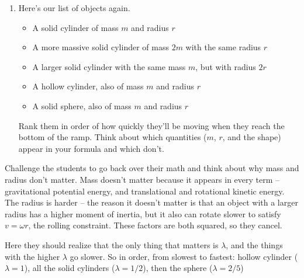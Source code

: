 \documentclass[12pt]{article}
\begin{document}
\begin{enumerate}
{{\begin{enumerate}
{    Regroup this to make it obvious what we're about to do:
    
    $$mgh = \frac{1}{2}mv^2 + \frac{1}{2} \lambda m\left(r^2 \omega ^2\right)$$
    
    Now we observe that $r^2 \omega^2 = v^2$:
    
    $$mgh = \frac{1}{2}mv^2 + \frac{1}{2} \lambda mv^2$$
    
    $$mgh = (1 + \lambda)mv^2 \rightarrow v = \sqrt{\frac{2gh}{1 + \lambda}}.$$
    
    Point out that this is generally true for any object of any shape -- you can use this one formula to understand cylinders, hollow balls, rings, whatever.
    
}
    \vfill Check your result with your TA once you have it.
    
    \newpage
    
    \item Here's our list of objects again.
    
\begin{itemize}
	\item A solid cylinder of mass $m$ and radius $r$
	\item A more massive solid cylinder of mass $2m$ with the same radius $r$
	\item A larger solid cylinder with the same mass $m$, but with radius $2r$
	\item A hollow cylinder, also of mass $m$ and radius $r$
	\item A solid sphere, also of mass $m$ and radius $r$
\end{itemize}
    
    Rank them in order of how quickly they'll be moving when they reach the bottom of the ramp. Think about which quantities ($m$, $r$, and the shape) appear in your formula and which don't.
    
\end{enumerate}
}
   {\color{red}
Challenge the students to go back over their math and think about why mass and radius don't matter. Mass doesn't matter because it appears in every term -- gravitational potential energy, and translational and rotational kinetic energy. The radius is harder -- the reason it doesn't matter is that an object with a larger radius has a  higher moment of inertia, but it also can rotate slower to satisfy $v = \omega r$, the rolling constraint. These factors are both squared, so they cancel.

Here they should realize that the only thing that matters is $\lambda$, and the things with the higher $\lambda$ go slower. So in order, from slowest to fastest: hollow cylinder ($\lambda=1$), all the solid cylinders ($\lambda = 1/2$), then the sphere ($\lambda = 2/5$)
}
\vspace{3in}

}
\end{enumerate}
\end{document}
